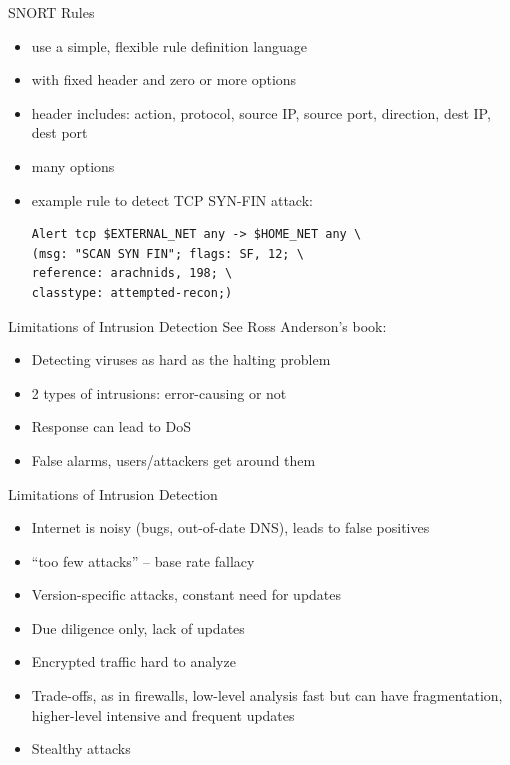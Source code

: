 \documentclass{beamer}
\begin{document}
\begin{frame}[fragile]{SNORT Rules}
  \begin{itemize}
  \item use a simple, flexible rule definition language 
  \item with fixed header and zero or more options 
  \item header includes: action, protocol, source IP, source 
    port, direction, dest IP, dest port 
  \item many options 
  \item example rule to detect TCP SYN-FIN attack:   
    \begin{verbatim}
Alert tcp $EXTERNAL_NET any -> $HOME_NET any \
(msg: "SCAN SYN FIN"; flags: SF, 12; \
reference: arachnids, 198; \
classtype: attempted-recon;)
    \end{verbatim}
  \end{itemize}
\end{frame}

\begin{frame}{Limitations of Intrusion Detection}
See Ross Anderson's book: 
  \begin{itemize}
  \item Detecting viruses as hard as the halting problem 
  \item 2 types of intrusions: error-causing or not 
  \item Response can lead to DoS
  \item False alarms, users/attackers get around them 
  \end{itemize}
\end{frame}

\begin{frame}{Limitations of Intrusion Detection}
  \begin{itemize}
  \item Internet is noisy (bugs, out-of-date DNS), leads to 
    false positives 
  \item ``too few attacks'' – base rate fallacy 
  \item Version-specific attacks, constant need for updates 
  \item Due diligence only, lack of updates 
  \item Encrypted traffic hard to analyze 
  \item Trade-offs, as in firewalls, low-level analysis fast but 
    can have fragmentation, higher-level intensive and 
    frequent updates 
  \item Stealthy attacks 
  \end{itemize}
\end{frame}
\end{document}
